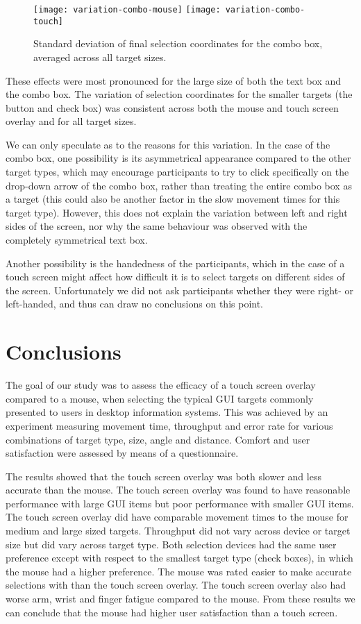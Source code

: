 \documentclass{elsart}
\begin{document}
\begin{figure}
	\centering
	\texttt{[image: variation-combo-mouse]}
	\texttt{[image: variation-combo-touch]}
	\caption{Standard deviation of final selection coordinates for the
	combo box, averaged across all target sizes.}
	\label{fig-variation-combobox}
\end{figure}


These effects were most pronounced for the large size of both the text
box and the combo box. The variation of selection coordinates for the
smaller targets (the button and check box) was consistent across both
the mouse and touch screen overlay and for all target sizes.

We can only speculate as to the reasons for this variation. In the case
of the combo box, one possibility is its asymmetrical appearance
compared to the other target types, which may encourage participants to
try to click specifically on the drop-down arrow of the combo box,
rather than treating the entire combo box as a target (this could also
be another factor in the slow movement times for this target type).
However, this does not explain the variation between left and right
sides of the screen, nor why the same behaviour was observed with the
completely symmetrical text box.

Another possibility is the handedness of the participants, which in the
case of a touch screen might affect how difficult it is to select
targets on different sides of the screen. Unfortunately we did not ask
participants whether they were right- or left-handed, and thus can draw
no conclusions on this point.


\section{Conclusions}
\label{sec-conclusions}

The goal of our study was to assess the efficacy of a touch screen
overlay compared to a mouse, when selecting the typical GUI targets
commonly presented to users in desktop information systems. This was
achieved by an experiment measuring movement time, throughput and error
rate for various combinations of target type, size, angle and distance.
Comfort and user satisfaction were assessed by means of a questionnaire.

The results showed that the touch screen overlay was both slower and
less accurate than the mouse. The touch screen overlay was found to have
reasonable performance with large GUI items but poor performance with
smaller GUI items. The touch screen overlay did have comparable movement
times to the mouse for medium and large sized targets. Throughput did
not vary across device or target size but did vary across target type.
Both selection devices had the same user preference except with respect
to the smallest target type (check boxes), in which the mouse had a
higher preference. The mouse was rated easier to make accurate
selections with than the touch screen overlay. The touch screen overlay
also had worse arm, wrist and finger fatigue compared to the mouse. From
these results we can conclude that the mouse had higher user
satisfaction than a touch screen.
\end{document}
